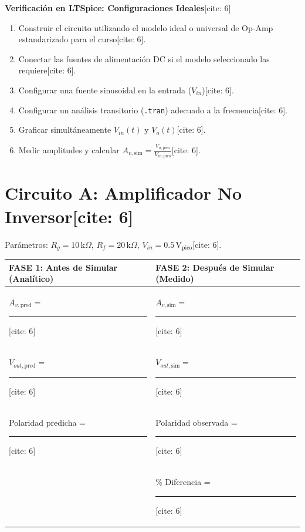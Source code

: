 \documentclass[11pt, a4paper]{article}
\begin{document}
\begin{center}
    \Large\textbf{\textcolor{ucbblue}{Verificación en LTSpice: Configuraciones Ideales}}[cite: 6]
\end{center}

\begin{tcolorbox}[colback=ucbblue!5!white, colframe=ucbblue, title=\textbf{Procedimiento Mínimo de Simulación[cite: 6]}]
    \begin{enumerate}
        \item Construir el circuito utilizando el modelo ideal o universal de Op-Amp estandarizado para el curso[cite: 6].
        \item Conectar las fuentes de alimentación DC si el modelo seleccionado las requiere[cite: 6].
        \item Configurar una fuente sinusoidal en la entrada ($V_{in}$)[cite: 6].
        \item Configurar un análisis transitorio (\texttt{.tran}) adecuado a la frecuencia[cite: 6].
        \item Graficar simultáneamente $V_{in}(t)$ y $V_o(t)$[cite: 6].
        \item Medir amplitudes y calcular $A_{v, \text{sim}} = \frac{V_{o, \text{pico}}}{V_{in, \text{pico}}}$[cite: 6].
    \end{enumerate}
\end{tcolorbox}

\section*{Circuito A: Amplificador No Inversor[cite: 6]}
Parámetros: $R_g = 10\,\text{k}\Omega$, $R_f = 20\,\text{k}\Omega$, $V_{in} = 0.5\,\text{V}_{\text{pico}}$[cite: 6].

\begin{table}[h]
    \centering
    \renewcommand{\arraystretch}{1.5}
    \begin{tabularx}{\textwidth}{@{} X X @{}}
    \toprule
    \rowcolor[HTML]{EFEFEF}
    \textbf{FASE 1: Antes de Simular (Analítico)} & \textbf{FASE 2: Después de Simular (Medido)} \\ \midrule
    $A_{v, \text{pred}} =$ \rule{3cm}{0.4pt}[cite: 6] & $A_{v, \text{sim}} =$ \rule{3cm}{0.4pt}[cite: 6] \\
    $V_{out, \text{pred}} =$ \rule{3cm}{0.4pt}[cite: 6] & $V_{out, \text{sim}} =$ \rule{3cm}{0.4pt}[cite: 6] \\
    Polaridad predicha = \rule{3cm}{0.4pt}[cite: 6] & Polaridad observada = \rule{2.5cm}{0.4pt}[cite: 6] \\
    & \% Diferencia = \rule{3cm}{0.4pt}[cite: 6] \\
    \bottomrule
    \end{tabularx}
\end{table}
\end{document}
